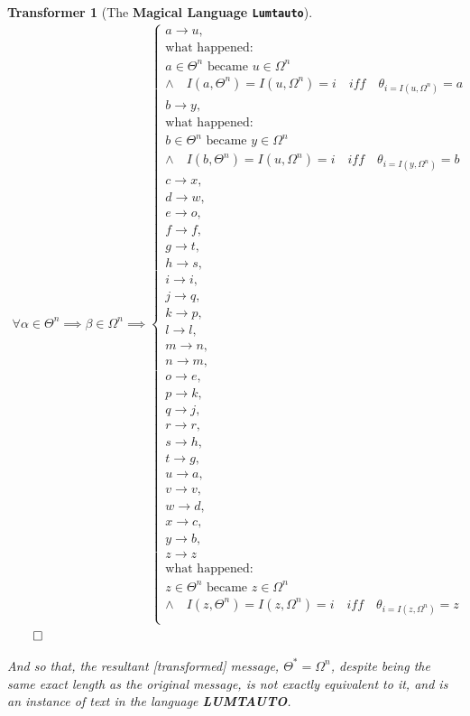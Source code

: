 \documentclass[a4paper, 18pt]{book} %
\newtheorem{transf}{Transformer}
\begin{document}
\begin{transf}[The \textbf{Magical Language \texttt{Lumtauto}}]
{\begin{multline}
\label{EQLUMTAUTO}
\forall \alpha \in \Theta^n \implies \beta \in \Omega^n \implies \begin{cases}
a \rightarrow u, & \\ \text{what happened: }\\ a \in \Theta^n \text{ became } u \in \Omega^n\\ \land \quad I(a,\Theta^n) = I(u,\Omega^n) = i \quad iff \quad \theta_{i=I(u,\Omega^n)} = a\\
b \rightarrow y, & \\ \text{what happened: }\\b \in \Theta^n \text{ became } y \in \Omega^n\\ \land \quad I(b,\Theta^n) = I(u,\Omega^n) = i \quad iff \quad \theta_{i=I(y,\Omega^n)} = b\\
c \rightarrow x,& \\
d \rightarrow w,& \\
e \rightarrow o,& \\
f \rightarrow f,& \\
g \rightarrow t,& \\
h \rightarrow s,& \\
i \rightarrow i,& \\
j \rightarrow q,& \\
k \rightarrow p,& \\
l \rightarrow l,& \\
m \rightarrow n,& \\
n \rightarrow m,& \\
o \rightarrow e,& \\
p \rightarrow k,& \\
q \rightarrow j,& \\
r \rightarrow r,& \\
s \rightarrow h,& \\
t \rightarrow g,& \\
u \rightarrow a,& \\
v \rightarrow v,& \\
w \rightarrow d,& \\
x \rightarrow c,& \\
y \rightarrow b,& \\
z \rightarrow z& \\ \text{what happened: }\\z \in \Theta^n \text{ became } z \in \Omega^n\\ \land \quad I(z,\Theta^n) = I(z,\Omega^n) = i \quad iff \quad \theta_{i=I(z,\Omega^n)} = z\\
\end{cases}
\end{multline}
$\qed$
}

And so that, the resultant [transformed] message, $\Theta^* = \Omega^n$, despite being the same exact length as the original message, is not exactly equivalent to it, and is an instance of text in the language \textbf{LUMTAUTO}.

\end{transf}
\end{document}
